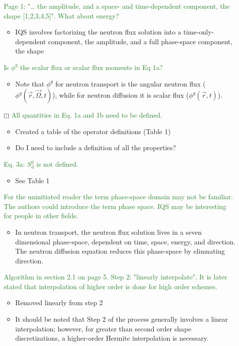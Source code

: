 \documentclass{elsarticle}
\newcommand{\working}{$\boxdot$}
\newcommand{\done}{\checkmark}
\newcommand{\easy}[1]{\textcolor{ForestGreen}{#1}}
\begin{document}
\begin{itemize}

\item[\done] \easy{ Page 1: "… the amplitude, and a space- and time-dependent component, the shape [1,2,3,4,5]". What about energy? }
\begin{itemize}
\item IQS involves factorizing the neutron flux solution into a time-only-dependent component, the amplitude, and a full phase-space component, the shape
\end{itemize}

\item[\done] \easy{ Is $\phi^g$ the scalar flux or scalar flux moments in Eq 1a? }
\begin{itemize}
\item Note that $\phi^g$ for neutron transport is the angular neutron flux ($\phi^g(\vec r, \vec\Omega, t)$), while for neutron diffusion it is scalar flux ($\phi^g(\vec r, t)$).
\end{itemize}

\item[\working] \easy{ All quantities in Eq. 1a and 1b need to be defined. }
\begin{itemize}
\item Created a table of the operator definitions (Table 1)
\item Do I need to include a definition of all the properties?
\end{itemize}

\item[\done] \easy{ Eq. 3a: $S_d^g$ is not defined. }
\begin{itemize}
\item See Table 1
\end{itemize}

\item[\done] \easy{ For the uninitiated reader the term phase-space domain may not be familiar. The authors could introduce the term phase space. IQS may be interesting for people in other fields. }
\begin{itemize}
\item In neutron transport, the neutron flux solution lives in a seven dimensional phase-space, dependent on time, space, energy, and direction. The neutron diffusion equation reduces this phase-space by elimnating direction.
\end{itemize}

\item[\done] \easy{ Algorithm in section 2.1 on page 5. Step 2: "linearly interpolate". It is later stated that interpolation of higher order is done for high order schemes. }
\begin{itemize}
\item Removed linearly from step 2
\item It should be noted that Step 2 of the process generally involves a linear interpolation; however, for greater than second order shape discretizations, a higher-order Hermite interpolation is necessary. 
\end{itemize}


\end{itemize}
\end{document}
